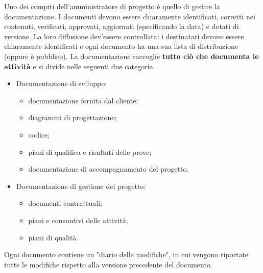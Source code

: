 \documentclass[a4paper]{article}
\begin{document}
		
Uno dei compiti dell'amministratore di progetto è quello di gestire la documentazione. I documenti devono essere chiaramente identificati, corretti nei contenuti, verificati, approvati, aggiornati (specificando la data) e dotati di versione. La loro diffusione dev'essere controllata: i destinatari devono essere chiaramente identificati e ogni documento ha una sua lista di distribuzione (oppure è pubblico). La documentazione raccoglie \textbf{tutto ciò che documenta le attività} e si divide nelle seguenti due categorie.
		
	\begin{itemize}
		
			
	\item Documentazione di sviluppo:
				
	\begin{itemize}
		
					
	\item documentazione fornita dal cliente;
					
	\item diagrammi di progettazione;
					
	\item codice;
					
	\item piani di qualifica e risultati delle prove;
					
	\item documentazione di accompagnamento del progetto.
				
	\end{itemize}

			
			
	\item Documentazione di gestione del progetto:
				
	\begin{itemize}
		
					
	\item documenti contrattuali;
					
	\item piani e consuntivi delle attività;
					
	\item piani di qualità.
				
	\end{itemize}

			
		
	\end{itemize}

		
Ogni documento contiene un "diario delle modifiche", in cui vengono riportate tutte le modifiche rispetto alla versione precedente del documento.
\end{document}
